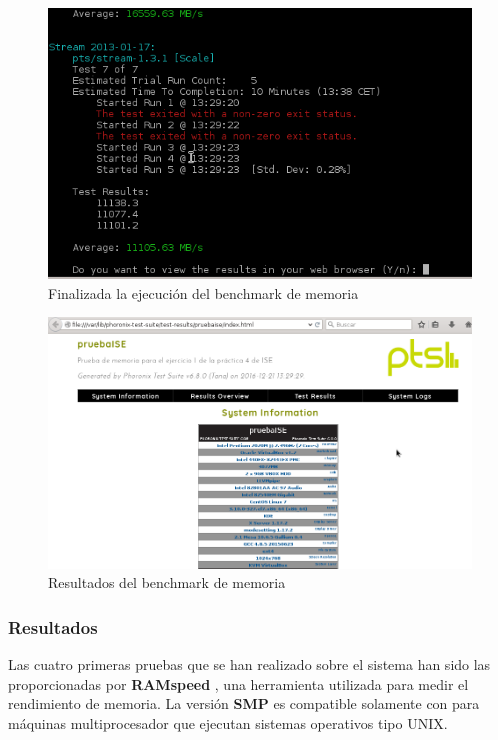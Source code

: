 \begin{figure}[H] %
	\centering
	\includegraphics[scale=0.9]{figuras/ejercicio1/figura1-12.png} 
	\caption{Finalizada la ejecución del benchmark de memoria} 
	\label{fig:figura1-12}
\end{figure}

\begin{figure}[H] %
	\centering
	\includegraphics[scale=0.6]{figuras/ejercicio1/figura1-13.png} 
	\caption{Resultados del benchmark de memoria} 
	\label{fig:figura1-13}
\end{figure}


\subsubsection{Resultados}

Las cuatro primeras pruebas que se han realizado sobre el sistema han sido las proporcionadas por \textbf{RAMspeed} \cite{enlace3}, una herramienta utilizada para medir el rendimiento de memoria. La versión \textbf{SMP} es compatible solamente con para máquinas multiprocesador que ejecutan sistemas operativos tipo UNIX.
\\

